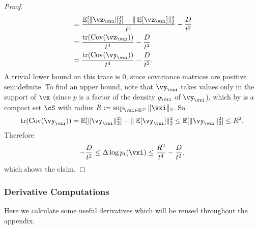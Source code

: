 \documentclass[../../book-main.tex]{subfiles}
\begin{document}
\begin{proof}
\begin{align}
        &= \frac{\Ex[\norm{\vz_{\vxi}}_{2}^{2}] - \norm{\Ex[\vz_{\vxi}]}_{2}^{2}}{t^{4}} - \frac{D}{t^{2}} \\
        &= \frac{\tr(\Cov(\vz_{\vxi}))}{t^{4}} - \frac{D}{t^{2}} \\
        &= \frac{\tr(\Cov(\vy_{\vxi}))}{t^{4}} - \frac{D}{t^{2}}.
    \end{align}
    A trivial lower bound on this trace is \(0\), since covariance matrices are positive semidefinite. To find an upper bound, note that \(\vy_{\vxi}\) takes values only in the support of \(\vx\) (since \(p\) is a factor of the density \(q_{\vxi}\) of \(\vy_{\vxi}\)), which by  is a compact set \(\cS\) with radius \(R := \sup_{\vxi \in \R^{D}}\norm{\vxi}_{2}\). So 
    \begin{equation}
        \tr(\Cov(\vy_{\vxi})) = \Ex[\norm{\vy_{\vxi}}_{2}^{2}] - \norm{\Ex[\vy_{\vxi}]}_{2}^{2} \leq \Ex[\norm{\vy_{\vxi}}_{2}^{2}] \leq R^{2}.
    \end{equation}
    Therefore 
    \begin{equation}
        -\frac{D}{t^{2}} \leq \Delta \log p_{t}(\vxi) \leq \frac{R^{2}}{t^{4}} - \frac{D}{t^{2}},
    \end{equation}
    which shows the claim.
\end{proof}

\subsubsection{Derivative Computations}

Here we calculate some useful derivatives which will be reused throughout the appendix.
\end{document}
